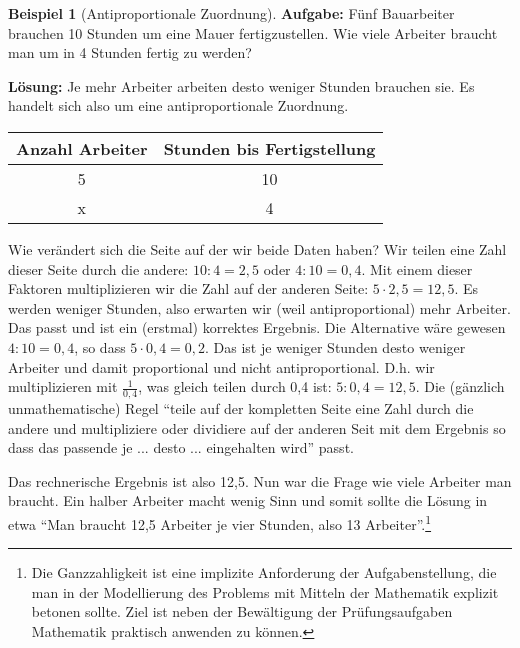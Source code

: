 \documentclass[a4paper]{book}%
\newcommand{\proofsquare}{
    \begin{flushright}
      $\square$
    \end{flushright}\xspace
}
\theoremstyle{definition}
\newtheorem{beispiel}{Beispiel}
\begin{document}
\begin{beispiel}[Antiproportionale Zuordnung]
    \textbf{Aufgabe:} Fünf Bauarbeiter brauchen 10 Stunden um eine Mauer fertigzustellen. Wie viele Arbeiter braucht man um in 4 Stunden fertig zu werden?

    \textbf{Lösung:} Je mehr Arbeiter arbeiten desto weniger Stunden brauchen sie. Es handelt sich also um eine antiproportionale Zuordnung.

    \begin{center}
        \begin{tabular}{|c|c|}
          \hline
          Anzahl Arbeiter & Stunden bis Fertigstellung\\
          \hline
          5 & 10 \\
          x & 4 \\
          \hline
        \end{tabular}
    \end{center}

    Wie verändert sich die Seite auf der wir beide Daten haben? Wir teilen eine Zahl dieser Seite durch die andere: $10:4=2,5$ oder $4:10=0,4$. Mit einem dieser Faktoren multiplizieren wir die Zahl auf der anderen Seite: $5 \cdot 2,5 = 12,5$. Es werden weniger Stunden, also erwarten wir (weil antiproportional) mehr Arbeiter. Das passt und ist ein (erstmal) korrektes Ergebnis. Die Alternative wäre gewesen $4:10=0,4$, so dass $5 \cdot 0,4 = 0,2$. Das ist je weniger Stunden desto weniger Arbeiter und damit proportional und nicht antiproportional. D.h. wir multiplizieren mit $\frac{1}{0,4}$, was gleich teilen durch 0,4 ist: $5:0,4=12,5$. Die (gänzlich unmathematische) Regel \enquote{teile auf der kompletten Seite eine Zahl durch die andere und multipliziere oder dividiere auf der anderen Seit mit dem Ergebnis so dass das passende je ... desto ... eingehalten wird} passt.

    Das rechnerische Ergebnis ist also 12,5. Nun war die Frage wie viele Arbeiter man braucht. Ein halber Arbeiter macht wenig Sinn und somit sollte die Lösung in etwa \enquote{Man braucht 12,5 Arbeiter je vier Stunden, also 13 Arbeiter}.\footnote{Die Ganzzahligkeit ist eine implizite Anforderung der Aufgabenstellung, die man in der Modellierung des Problems mit Mitteln der Mathematik explizit betonen sollte. Ziel ist neben der Bewältigung der Prüfungsaufgaben Mathematik praktisch anwenden zu können.}\glsdisp{symb:qed}{\proofsquare}
\end{beispiel}
\end{document}
